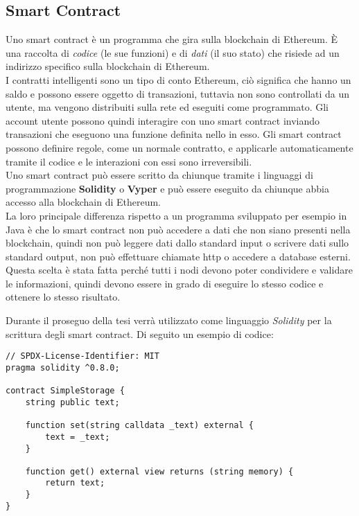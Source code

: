 \subsection{Smart Contract}
\label{cha:smart-contract}
Uno smart contract è un programma che gira sulla blockchain di Ethereum. È una
raccolta di \textit{codice} (le sue funzioni) e di \textit{dati} (il suo stato)
che risiede ad un indirizzo specifico sulla blockchain di Ethereum. \\
I contratti intelligenti sono un tipo di conto Ethereum, ciò significa che
hanno un saldo e possono essere oggetto di transazioni, tuttavia non sono
controllati da un utente, ma vengono distribuiti sulla rete ed eseguiti come
programmato. Gli account utente possono quindi interagire con uno smart
contract inviando transazioni che eseguono una funzione definita nello in esso.
Gli smart contract possono definire regole, come un normale contratto,
e applicarle automaticamente tramite il codice e le interazioni con essi sono
irreversibili. \\
Uno smart contract può essere scritto da chiunque tramite i linguaggi di
programmazione \textbf{Solidity} o \textbf{Vyper} e può essere eseguito da
chiunque abbia accesso alla blockchain di Ethereum. \\
La loro principale differenza rispetto a un programma sviluppato per esempio in
Java è che lo smart contract non può accedere a dati che non siano presenti
nella blockchain, quindi non può leggere dati dallo standard input o scrivere
dati sullo standard output, non può effettuare chiamate http o accedere a
database esterni. Questa scelta è stata fatta perché tutti i nodi devono poter
condividere e validare le informazioni, quindi devono essere in grado di
eseguire lo stesso codice e ottenere lo stesso risultato.

Durante il proseguo della tesi verrà utilizzato come linguaggio \textit{Solidity}
per la scrittura degli smart contract. Di seguito un esempio di codice:

\begin{lstlisting}[language=Solidity]
// SPDX-License-Identifier: MIT
pragma solidity ^0.8.0;

contract SimpleStorage {
    string public text;

    function set(string calldata _text) external {
        text = _text;
    }

    function get() external view returns (string memory) {
        return text;
    }
}
\end{lstlisting}

